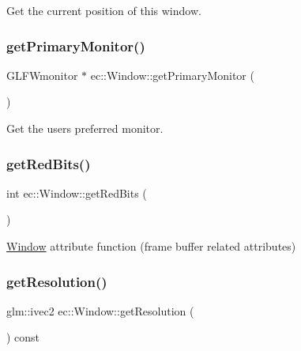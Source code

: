Get the current position of this window. \mbox{\label{classec_1_1_window_ae519ec5a903d9ed1cefec30a4571a938}} 
\subsubsection{\texorpdfstring{get\+Primary\+Monitor()}{getPrimaryMonitor()}}
{\footnotesize\ttfamily G\+L\+F\+Wmonitor $\ast$ ec\+::\+Window\+::get\+Primary\+Monitor (\begin{DoxyParamCaption}{ }\end{DoxyParamCaption})\hspace{0.3cm}{\ttfamily [static]}}

Get the user\textquotesingle{}s preferred monitor. \mbox{\label{classec_1_1_window_aac6cd3cb2a9d033e41bbd04e84a7be14}} 
\subsubsection{\texorpdfstring{get\+Red\+Bits()}{getRedBits()}}
{\footnotesize\ttfamily int ec\+::\+Window\+::get\+Red\+Bits (\begin{DoxyParamCaption}{ }\end{DoxyParamCaption})\hspace{0.3cm}{\ttfamily [static]}}

\mbox{\hyperlink{classec_1_1_window}{Window}} attribute function (frame buffer related attributes) \mbox{\label{classec_1_1_window_a6ae374e668f695a5388f03e2ab6d0b58}} 
\subsubsection{\texorpdfstring{get\+Resolution()}{getResolution()}}
{\footnotesize\ttfamily glm\+::ivec2 ec\+::\+Window\+::get\+Resolution (\begin{DoxyParamCaption}{ }\end{DoxyParamCaption}) const}

